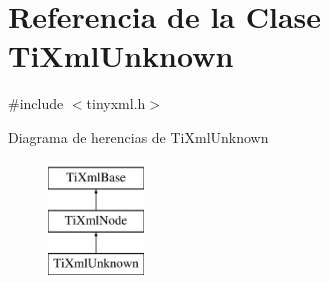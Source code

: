 \hypertarget{classTiXmlUnknown}{\section{\-Referencia de la \-Clase \-Ti\-Xml\-Unknown}
\label{classTiXmlUnknown}
}


{\ttfamily \#include $<$tinyxml.\-h$>$}

\-Diagrama de herencias de \-Ti\-Xml\-Unknown\begin{figure}[H]
\begin{center}
\leavevmode
\includegraphics[height=3.000000cm]{classTiXmlUnknown}
\end{center}
\end{figure}
